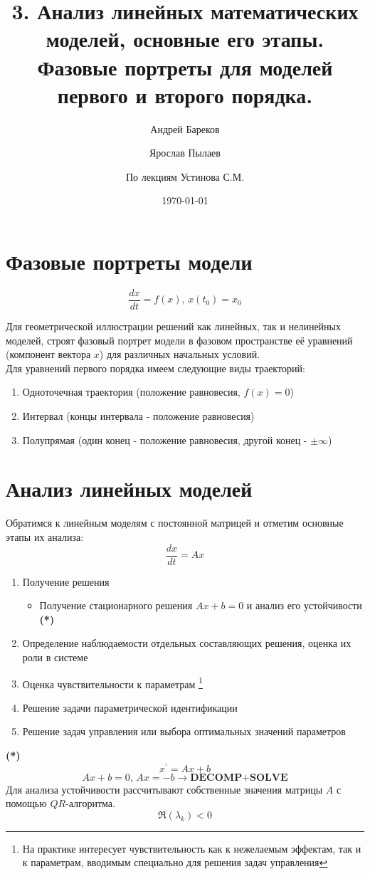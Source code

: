 \documentclass[a4paper,11pt]{article}
\title{3. Анализ линейных математических моделей, основные его этапы. Фазовые портреты для моделей первого и второго порядка.}
\author{Андрей Бареков \and Ярослав Пылаев \and По лекциям Устинова С.М.}
\date{\today}
\begin{document}
\maketitle
\newpage

\section{Фазовые портреты модели}
\begin{equation}
  \frac{dx}{dt} = f(x),\, x(t_0) = x_0
  \label{eq:DE}
\end{equation}

Для геометрической иллюстрации решений как линейных, так и нелинейных моделей, строят фазовый портрет модели в фазовом пространстве её уравнений
  (компонент вектора $x$) для различных начальных условий. \\
Для уравнений первого порядка имеем следующие виды траекторий: 
\begin{enumerate}
  \item Одноточечная траектория (положение равновесия, $f(x) = 0$)
  \item Интервал (концы интервала - положение равновесия)
  \item Полупрямая (один конец - положение равновесия, другой конец - $\pm \infty$)
\end{enumerate}

\section{Анализ линейных моделей}
Обратимся к линейным моделям с постоянной матрицей и отметим основные этапы их анализа:
\[\frac{dx}{dt} = Ax\]
\begin{enumerate}
  \item Получение решения
  \begin{itemize}
    \item Получение стационарного решения $Ax + b = 0$ и анализ его устойчивости \textbf{(*)}
  \end{itemize}
  \item Определение наблюдаемости отдельных составляющих решения, оценка их роли в системе
  \item Оценка чувствительности к параметрам \footnote{На практике интересует чувствительность как к нежелаемым эффектам, так и к параметрам, вводимым специально для решения задач управления}
  \item Решение задачи параметрической идентификации
  \item Решение задач управления или выбора оптимальных значений параметров
\end{enumerate}
\begin{importantblock}
  \textbf{(*)} \\
  \[x^{'} = Ax + b\]
  \[Ax + b = 0,\, Ax = -b \rightarrow \textbf{DECOMP+SOLVE}\]
  Для анализа устойчивости рассчитывают собственные значения матрицы $A$ с помощью $QR$-алгоритма.
  \[\Re(\lambda_k) < 0\]
\end{importantblock}
\end{document}
